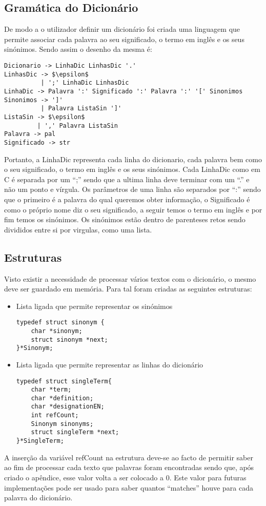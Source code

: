 \documentclass{llncs}
\begin{document}
\subsection{Gramática do Dicionário}
De modo a o utilizador definir um dicionário foi criada uma linguagem que permite associar cada palavra ao seu significado, o termo em inglês e os seus sinónimos. Sendo assim o desenho da mesma é:
\begin{lstlisting}[mathescape]
Dicionario -> LinhaDic LinhasDic '.' 
LinhasDic -> $\epsilon$ 
          | ';' LinhaDic LinhasDic 
LinhaDic -> Palavra ':' Significado ':' Palavra ':' '[' Sinonimos 
Sinonimos -> ']' 
          | Palavra ListaSin ']' 
ListaSin -> $\epsilon$ 
         | ',' Palavra ListaSin 
Palavra -> pal 
Significado -> str 
\end{lstlisting}
Portanto, a LinhaDic representa cada linha do dicionario, cada palavra bem como o seu significado, o termo em inglês e os seus sinónimos. Cada LinhaDic como em C é separada por um ``;'' sendo que a ultima linha deve terminar com um ``.'' e não um ponto e vírgula. Os parâmetros de uma linha são separados por ``:'' sendo que o primeiro é a palavra do qual queremos obter informação, o Significado é como o próprio nome diz o seu significado, a seguir temos o termo em inglês e por fim temos os sinónimos. Os sinónimos estão dentro de parenteses retos sendo divididos entre si por virgulas, como uma lista.

\subsection{Estruturas}
Visto existir a necessidade de processar vários textos com o dicionário, o mesmo deve ser guardado em memória. Para tal foram criadas as seguintes estruturas:
\renewcommand{\labelitemi}{$\bullet$}
\begin{itemize}
\item Lista ligada que permite representar os sinónimos
\begin{lstlisting}
typedef struct sinonym {
    char *sinonym;
    struct sinonym *next;
}*Sinonym;
\end{lstlisting}
\item Lista ligada que permite representar as linhas do dicionário
\begin{lstlisting}
typedef struct singleTerm{
    char *term;
    char *definition;
    char *designationEN;
    int refCount;
    Sinonym sinonyms;
    struct singleTerm *next;
}*SingleTerm;
\end{lstlisting}
\end{itemize}
A inserção da variável refCount na estrutura deve-se ao facto de permitir saber ao fim de processar cada texto que palavras foram encontradas sendo que, após criado o apêndice, esse valor volta a ser colocado a 0. Este valor para futuras implementações pode ser usado para saber quantos ``matches'' houve para cada palavra do dicionário.
\end{document}
